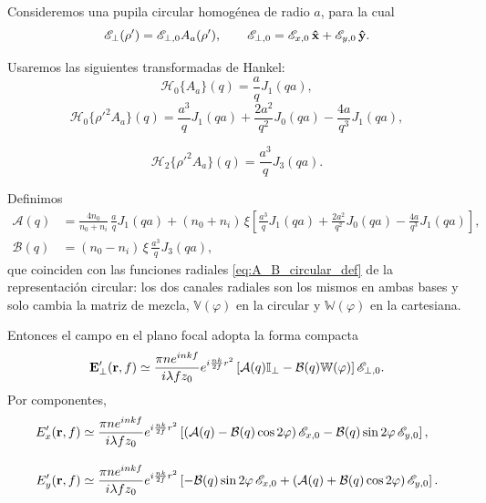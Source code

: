 Consideremos una pupila circular homogénea de radio $a$, para la cual
\begin{equation}
\mathscr E_\perp(\rho')
=
\mathscr E_{\perp,0}A_a(\rho'),
\qquad
\mathscr E_{\perp,0}
=
\mathscr E_{x,0}\,\bm{\hat{\mathbf{x}}}
+
\mathscr E_{y,0}\,\bm{\hat{\mathbf{y}}}.
\label{eq:cartesian_homogeneous_pupil_def}
\end{equation}

Usaremos las siguientes transformadas de Hankel:
\begin{equation}
\mathscr H_0\{A_a\}(q)
=
\frac{a}{q}J_1(qa),
\label{eq:H0_Aa_cartesian}
\end{equation}
\begin{equation}
\mathscr H_0\{\rho'^2A_a\}(q)
=
\frac{a^3}{q}J_1(qa)
+
\frac{2a^2}{q^2}J_0(qa)
-
\frac{4a}{q^3}J_1(qa),
\label{eq:H0_rho2_Aa_cartesian}
\end{equation}

\begin{equation}
\mathscr H_2\{\rho'^2A_a\}(q)
=
\frac{a^3}{q}J_3(qa).
\label{eq:H2_rho2_Aa_cartesian}
\end{equation}

Definimos
\begin{equation}
\begin{aligned}
\mathcal A(q)
&=
\frac{4n_0}{n_0+n_i}\,
\frac{a}{q}J_1(qa)
+
(n_0+n_i)\,\xi
\left[
\frac{a^3}{q}J_1(qa)
+
\frac{2a^2}{q^2}J_0(qa)
-
\frac{4a}{q^3}J_1(qa)
\right],
\\[0.5em]
\mathcal B(q)
&=
(n_0-n_i)\,\xi\,
\frac{a^3}{q}J_3(qa),
\end{aligned}
\label{eq:A_B_cartesian_def}
\end{equation}
que coinciden con las funciones radiales \eqref{eq:A_B_circular_def} de la representación circular: los dos canales radiales son los mismos en ambas bases y solo cambia la matriz de mezcla, $\mathbb V(\varphi)$ en la circular y $\mathbb W(\varphi)$ en la cartesiana.

Entonces el campo en el plano focal adopta la forma compacta
\begin{equation}
\vb E'_\perp(\vb r,f)
\simeq
\frac{\pi n e^{inkf}}{i\lambda f z_0}
e^{i\frac{nk}{2f}r^2}
\left[
\mathcal A(q)\mathbb I_\perp
-
\mathcal B(q)\mathbb W(\varphi)
\right]
\mathscr E_{\perp,0}.
\label{eq:E_field_cartesian_homogeneous}
\end{equation}
Por componentes,
\begin{equation}
\begin{aligned}
E'_x(\vb r,f)
&\simeq
\frac{\pi n e^{inkf}}{i\lambda f z_0}
e^{i\frac{nk}{2f}r^2}
\left[
\left(
\mathcal A(q)-\mathcal B(q)\cos2\varphi
\right)\mathscr E_{x,0}
-
\mathcal B(q)\sin2\varphi\,\mathscr E_{y,0}
\right],
\\[1em]
E'_y(\vb r,f)
&\simeq
\frac{\pi n e^{inkf}}{i\lambda f z_0}
e^{i\frac{nk}{2f}r^2}
\left[
-
\mathcal B(q)\sin2\varphi\,\mathscr E_{x,0}
+
\left(
\mathcal A(q)+\mathcal B(q)\cos2\varphi
\right)\mathscr E_{y,0}
\right].
\end{aligned}
\label{eq:Ex_Ey_cartesian_homogeneous}
\end{equation}


